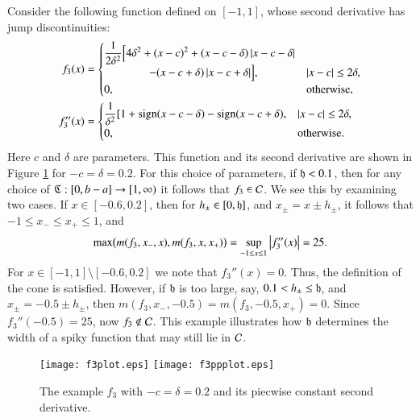 \documentclass[review]{elsarticle}
\theoremstyle{definition}
\begin{document}
Consider the following function defined on $[-1,1]$, whose second derivative has jump discontinuities:
\begin{align*}
f_3(x) & = \begin{cases} \displaystyle
   \frac{1}{2\delta^2} \Bigl [4 \delta^2 + (x-c)^2 + (x-c-\delta)\left \lvert x-c-\delta \right \rvert
\\ \qquad \qquad
    - (x-c+\delta)\left \lvert x-c+\delta \right \rvert \Bigr ], & \left \lvert x-c \right \rvert \le 2\delta,
\\ 0, & \text{otherwise},
\end{cases} \\
f''_3(x) & =
\begin{cases} \displaystyle
    \frac{1}{\delta^2} [1 + \operatorname{sign}(x-c-\delta) - \operatorname{sign}(x-c+\delta), & \left \lvert x-c \right \rvert \le 2\delta,
\\ 0, & \text{otherwise}.
\end{cases}
\end{align*}
Here $c$ and $\delta$ are parameters. This function and its second derivative
are shown in Figure \ref{f3fig} for $-c=\delta = 0.2$. For this choice of
parameters, if $\mathfrak{h} < 0.1$, then for
any choice of $\mathfrak{C} : [0,b-a] \to [1,\infty)$ it follows that $f_3 \in \mathcal{C}$.  We see this by examining two cases.  If $x \in [-0.6, 0.2]$, then for $h_\pm \in [0,\mathfrak{h}]$, and $x_\pm = x\pm h_\pm$, it follows that $-1 \le x_- \le x_+ \le 1$, and
\[
\max\bigl(m(f_3,x_-,x),m(f_3,x,x_+)\bigr) = \sup_{-1 \le x \le 1} \left \lvert f_3''(x) \right \rvert  = 25.
\]
For $x \in [-1,1] \setminus [-0.6, 0.2]$ we note that $f_3''(x) = 0$. Thus, the definition of the cone is satisfied.
However, if $\mathfrak{h}$ is too large, say, $0.1 < h_\pm \le \mathfrak{h}$, and $x_\pm = -0.5\pm
h_\pm$, then $m(f_3,x_-,-0.5)=m(f_3,-0.5,x_+)=0$. Since $f_3''(-0.5) = 25$,
now $f_3 \notin \mathcal{C}$. This example illustrates how $\mathfrak{h}$ determines the width of
a spiky function that may still lie in $\mathcal{C}$.

\begin{figure}[t]
\centering
\texttt{[image: f3plot.eps]} \quad
\texttt{[image: f3ppplot.eps]}
\caption{The example $f_3$ with $-c=\delta = 0.2$  and its piecwise constant second derivative.}
\label{f3fig}
\end{figure}
\end{document}
